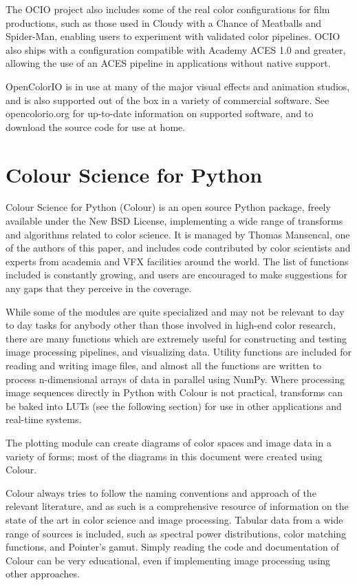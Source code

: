 The OCIO project also includes some of the real color configurations for film productions, such as those used in Cloudy with a Chance of Meatballs and Spider-Man, enabling users to experiment with validated color pipelines. OCIO also ships with a configuration compatible with Academy ACES 1.0 and greater, allowing the use of an ACES pipeline in applications without native support.

OpenColorIO is in use at many of the major visual effects and animation studios, and is also supported out of the box in a variety of commercial software. See opencolorio.org for up-to-date information on supported software, and to download the source code for use at home.

\section{Colour Science for Python}

Colour Science for Python (Colour) is an open source Python package, freely available under the New BSD License, implementing a wide range of transforms and algorithms related to color science. It is managed by Thomas Mansencal, one of the authors of this paper, and includes code contributed by color scientists and experts from academia and VFX facilities around the world. The list of functions included is constantly growing, and users are encouraged to make suggestions for any gaps that they perceive in the coverage.

While some of the modules are quite specialized and may not be relevant to day to day tasks for anybody other than those involved in high-end color research, there are many functions which are extremely useful for constructing and testing image processing pipelines, and visualizing data. Utility functions are included for reading and writing image files, and almost all the functions are written to process n-dimensional arrays of data in parallel using NumPy. Where processing image sequences directly in Python with Colour is not practical, transforms can be baked into LUTs (see the following section) for use in other applications and real-time systems.

The plotting module can create diagrams of color spaces and image data in a variety of forms; most of the diagrams in this document were created using Colour.

Colour always tries to follow the naming conventions and approach of the relevant literature, and as such is a comprehensive resource of information on the state of the art in color science and image processing. Tabular data from a wide range of sources is included, such as spectral power distributions, color matching functions, and Pointer’s gamut. Simply reading the code and documentation of Colour can be very educational, even if implementing image processing using other approaches.

